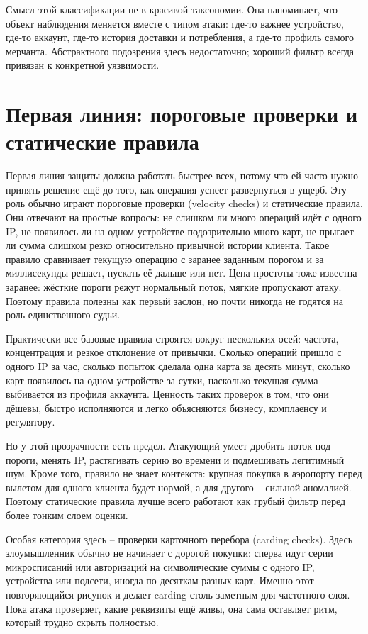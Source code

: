 Смысл этой классификации не в красивой таксономии. Она напоминает,
что объект наблюдения меняется вместе с типом атаки: где-то важнее
устройство, где-то аккаунт, где-то история доставки и потребления, а
где-то профиль самого мерчанта. Абстрактного подозрения здесь
недостаточно; хороший фильтр всегда привязан к конкретной
уязвимости.

\section{Первая линия: пороговые проверки и статические правила}
\label{sec:fraud-rules}

Первая линия защиты должна работать быстрее всех, потому что ей
часто нужно принять решение ещё до того, как операция успеет
развернуться в ущерб. Эту роль обычно играют пороговые проверки
(velocity checks) и статические правила. Они отвечают на простые
вопросы: не слишком ли много операций идёт с одного IP, не появилось
ли на одном устройстве подозрительно много карт, не прыгает ли сумма
слишком резко относительно привычной истории клиента. Такое правило
сравнивает текущую операцию с заранее заданным порогом и за
миллисекунды решает, пускать её дальше или нет. Цена простоты тоже
известна заранее: жёсткие пороги режут нормальный поток, мягкие
пропускают атаку. Поэтому правила полезны как первый заслон, но
почти никогда не годятся на роль единственного судьи.

Практически все базовые правила строятся вокруг нескольких осей:
частота, концентрация и резкое отклонение от привычки. Сколько
операций пришло с одного IP за час, сколько попыток сделала одна
карта за десять минут, сколько карт появилось на одном устройстве за
сутки, насколько текущая сумма выбивается из профиля аккаунта.
Ценность таких проверок в том, что они дёшевы, быстро исполняются и
легко объясняются бизнесу, комплаенсу и регулятору.

Но у этой прозрачности есть предел. Атакующий умеет дробить поток
под пороги, менять IP, растягивать серию во времени и подмешивать
легитимный шум. Кроме того, правило не знает контекста: крупная
покупка в аэропорту перед вылетом для одного клиента будет нормой,
а для другого -- сильной аномалией. Поэтому статические правила
лучше всего работают как грубый фильтр перед более тонким слоем
оценки.

Особая категория здесь -- проверки карточного перебора (carding
checks). Здесь злоумышленник обычно не начинает с дорогой покупки:
сперва идут серии микросписаний или авторизаций на символические
суммы с одного IP, устройства или подсети, иногда по десяткам разных
карт. Именно этот повторяющийся рисунок и делает carding столь
заметным для частотного слоя. Пока атака проверяет, какие реквизиты
ещё живы, она сама оставляет ритм, который трудно скрыть полностью.

